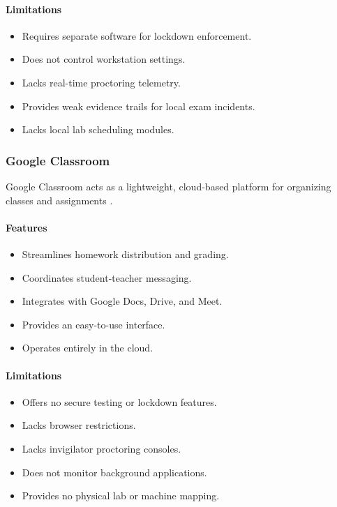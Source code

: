 \paragraph{Limitations}
\begin{itemize}[noitemsep]
\item Requires separate software for lockdown enforcement.
\item Does not control workstation settings.
\item Lacks real-time proctoring telemetry.
\item Provides weak evidence trails for local exam incidents.
\item Lacks local lab scheduling modules.
\end{itemize}

\subsubsection{Google Classroom}
Google Classroom acts as a lightweight, cloud-based platform for organizing classes and assignments \cite{gclassroom1}.

\paragraph{Features}
\begin{itemize}[noitemsep]
\item Streamlines homework distribution and grading.
\item Coordinates student-teacher messaging.
\item Integrates with Google Docs, Drive, and Meet.
\item Provides an easy-to-use interface.
\item Operates entirely in the cloud.
\end{itemize}

\paragraph{Limitations}
\begin{itemize}[noitemsep]
\item Offers no secure testing or lockdown features.
\item Lacks browser restrictions.
\item Lacks invigilator proctoring consoles.
\item Does not monitor background applications.
\item Provides no physical lab or machine mapping.
\end{itemize}

